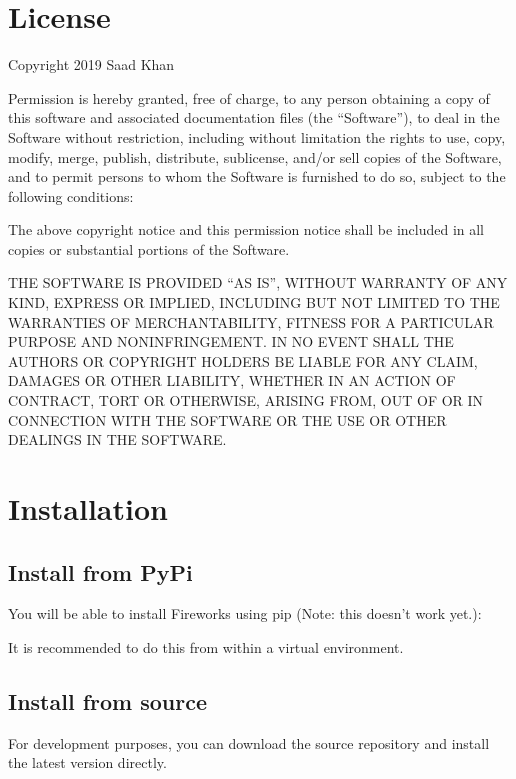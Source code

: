 \documentclass[letterpaper,10pt,english]{sphinxmanual}
\begin{document}
\section{License}
\label{\detokenize{License:license}}\label{\detokenize{License::doc}}
Copyright 2019 Saad Khan

Permission is hereby granted, free of charge, to any person obtaining a copy of this software and associated documentation files (the “Software”), to deal in the Software without restriction, including without limitation the rights to use, copy, modify, merge, publish, distribute, sublicense, and/or sell copies of the Software, and to permit persons to whom the Software is furnished to do so, subject to the following conditions:

The above copyright notice and this permission notice shall be included in all copies or substantial portions of the Software.

THE SOFTWARE IS PROVIDED “AS IS”, WITHOUT WARRANTY OF ANY KIND, EXPRESS OR IMPLIED, INCLUDING BUT NOT LIMITED TO THE WARRANTIES OF MERCHANTABILITY, FITNESS FOR A PARTICULAR PURPOSE AND NONINFRINGEMENT. IN NO EVENT SHALL THE AUTHORS OR COPYRIGHT HOLDERS BE LIABLE FOR ANY CLAIM, DAMAGES OR OTHER LIABILITY, WHETHER IN AN ACTION OF CONTRACT, TORT OR OTHERWISE, ARISING FROM, OUT OF OR IN CONNECTION WITH THE SOFTWARE OR THE USE OR OTHER DEALINGS IN THE SOFTWARE.


\section{Installation}
\label{\detokenize{Installation:installation}}\label{\detokenize{Installation::doc}}

\subsection{Install from PyPi}
\label{\detokenize{Installation:install-from-pypi}}
You will be able to install Fireworks using pip (Note: this doesn’t work yet.):

\begin{sphinxVerbatim}[commandchars=\\\{\}]
  
\end{sphinxVerbatim}

It is recommended to do this from within a virtual environment.


\subsection{Install from source}
\label{\detokenize{Installation:install-from-source}}
For development purposes, you can download the source repository and install the latest version directly.
\end{document}
